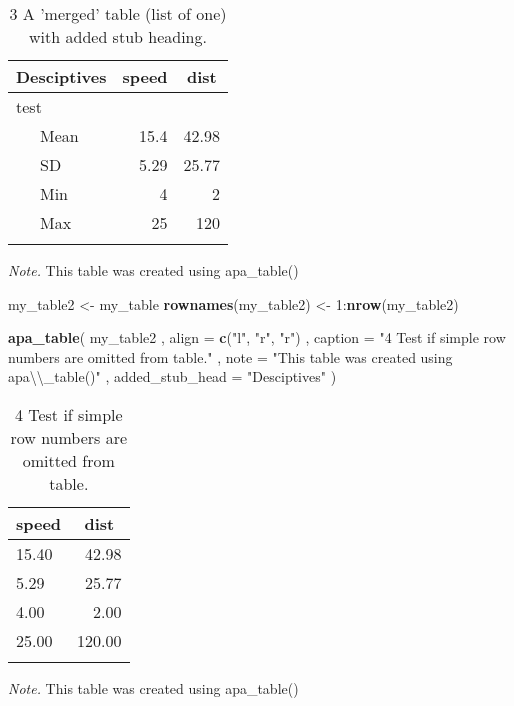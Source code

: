 \documentclass[english,man]{apa6}
\newenvironment{Shaded}{\begin{snugshade}}{\end{snugshade}}
\newcommand{\KeywordTok}[1]{\textcolor[rgb]{0.13,0.29,0.53}{\textbf{{#1}}}}
\newcommand{\DataTypeTok}[1]{\textcolor[rgb]{0.13,0.29,0.53}{{#1}}}
\newcommand{\DecValTok}[1]{\textcolor[rgb]{0.00,0.00,0.81}{{#1}}}
\newcommand{\CharTok}[1]{\textcolor[rgb]{0.31,0.60,0.02}{{#1}}}
\newcommand{\StringTok}[1]{\textcolor[rgb]{0.31,0.60,0.02}{{#1}}}
\newcommand{\NormalTok}[1]{{#1}}
\begin{document}
\begin{table}[tbp]
\begin{center}
\begin{threeparttable}
\caption{\label{tab:unnamed-chunk-4}3 A 'merged' table (list of one) with added stub heading.}
\begin{tabular}{lrr}
\toprule
Desciptives & \multicolumn{1}{c}{speed} & \multicolumn{1}{c}{dist}\\
\midrule
test &  & \\
\ \ \ Mean & 15.4 & 42.98\\
\ \ \ SD & 5.29 & 25.77\\
\ \ \ Min & 4 & 2\\
\ \ \ Max & 25 & 120\\
\bottomrule
\addlinespace
\end{tabular}
\begin{tablenotes}[para]
\textit{Note.} This table was created using apa\_table()
\end{tablenotes}
\end{threeparttable}
\end{center}
\end{table}

\begin{Shaded}
\begin{Highlighting}[]
\NormalTok{my_table2 <-}\StringTok{ }\NormalTok{my_table}
\KeywordTok{rownames}\NormalTok{(my_table2) <-}\StringTok{ }\DecValTok{1}\NormalTok{:}\KeywordTok{nrow}\NormalTok{(my_table2)}

\KeywordTok{apa_table}\NormalTok{(}
  \NormalTok{my_table2}
  \NormalTok{, }\DataTypeTok{align =} \KeywordTok{c}\NormalTok{(}\StringTok{"l"}\NormalTok{, }\StringTok{"r"}\NormalTok{, }\StringTok{"r"}\NormalTok{)}
  \NormalTok{, }\DataTypeTok{caption =} \StringTok{"4 Test if simple row numbers are omitted from table."}
  \NormalTok{, }\DataTypeTok{note =} \StringTok{"This table was created using apa}\CharTok{\textbackslash{}\textbackslash{}}\StringTok{_table()"}
  \NormalTok{, }\DataTypeTok{added_stub_head =} \StringTok{"Desciptives"}
\NormalTok{)}
\end{Highlighting}
\end{Shaded}

\begin{table}[tbp]
\begin{center}
\begin{threeparttable}
\caption{\label{tab:unnamed-chunk-4}4 Test if simple row numbers are omitted from table.}
\begin{tabular}{lr}
\toprule
speed & \multicolumn{1}{c}{dist}\\
\midrule
15.40 & 42.98\\
5.29 & 25.77\\
4.00 & 2.00\\
25.00 & 120.00\\
\bottomrule
\addlinespace
\end{tabular}
\begin{tablenotes}[para]
\textit{Note.} This table was created using apa\_table()
\end{tablenotes}
\end{threeparttable}
\end{center}
\end{table}
\end{document}
